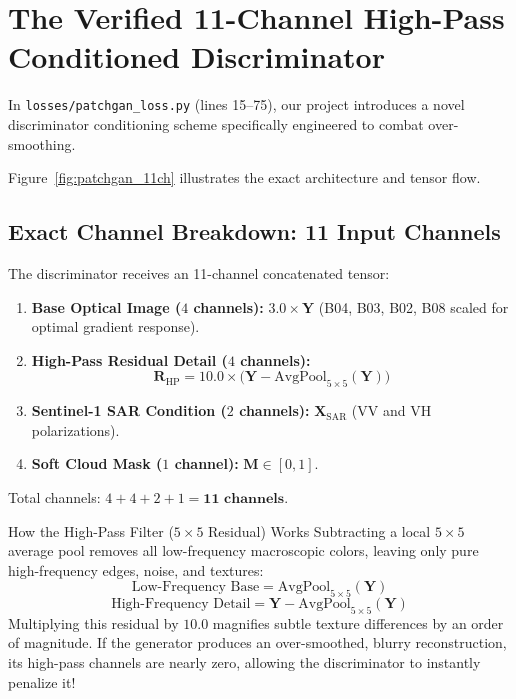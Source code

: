 \section{The Verified 11-Channel High-Pass Conditioned Discriminator}
In \texttt{losses/patchgan\_loss.py} (lines 15--75), our project introduces a novel discriminator conditioning scheme specifically engineered to combat over-smoothing.

Figure~\ref{fig:patchgan_11ch} illustrates the exact architecture and tensor flow.



\subsection{Exact Channel Breakdown: 11 Input Channels}
The discriminator receives an 11-channel concatenated tensor:
\begin{enumerate}
    \item \textbf{Base Optical Image ($4$ channels):} $3.0 \times \mathbf{Y}$ (B04, B03, B02, B08 scaled for optimal gradient response).
    \item \textbf{High-Pass Residual Detail ($4$ channels):}
    \begin{equation}
    \mathbf{R}_{\text{HP}} = 10.0 \times \big(\mathbf{Y} - \text{AvgPool}_{5\times 5}(\mathbf{Y})\big)
    \end{equation}
    \item \textbf{Sentinel-1 SAR Condition ($2$ channels):} $\mathbf{X}_{\text{SAR}}$ (VV and VH polarizations).
    \item \textbf{Soft Cloud Mask ($1$ channel):} $\mathbf{M} \in [0, 1]$.
\end{enumerate}
Total channels: $4 + 4 + 2 + 1 = \mathbf{11\text{ channels}}$.

\begin{mathbox}{How the High-Pass Filter ($5 \times 5$ Residual) Works}
Subtracting a local $5 \times 5$ average pool removes all low-frequency macroscopic colors, leaving only pure high-frequency edges, noise, and textures:
\[
\text{Low-Frequency Base} = \text{AvgPool}_{5\times 5}(\mathbf{Y})
\]
\[
\text{High-Frequency Detail} = \mathbf{Y} - \text{AvgPool}_{5\times 5}(\mathbf{Y})
\]
Multiplying this residual by $10.0$ magnifies subtle texture differences by an order of magnitude. If the generator produces an over-smoothed, blurry reconstruction, its high-pass channels are nearly zero, allowing the discriminator to instantly penalize it!
\end{mathbox}

